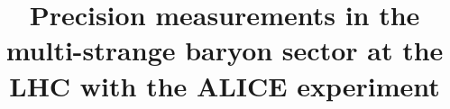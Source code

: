 \documentclass[ALICE,manyauthors]{cernphprep}
\begin{document}
%



\begin{titlepage}
	
	\title{\color{RoyalBlue4}Precision measurements in the \\multi-strange baryon sector at the LHC with the ALICE experiment}
	
%

\end{titlepage}
\setcounter{page}{2}








\tableofcontents

\cleardoublepage 
{} 


\cleardoublepage
{}


\end{document}
